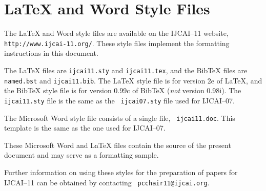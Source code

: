 \documentclass{article}
\begin{document}
\appendix

\section{\LaTeX{} and Word Style Files}\label{stylefiles}

The \LaTeX{} and Word style files are available on the IJCAI--11
website, {\tt http://www.ijcai-11.org/}.
These style files implement the formatting instructions in this
document.

The \LaTeX{} files are {\tt ijcai11.sty} and {\tt ijcai11.tex}, and
the Bib\TeX{} files are {\tt named.bst} and {\tt ijcai11.bib}. The
\LaTeX{} style file is for version 2e of \LaTeX{}, and the Bib\TeX{}
style file is for version 0.99c of Bib\TeX{} ({\em not} version
0.98i). The {\tt ijcai11.sty} file is the same as the {\tt
ijcai07.sty} file used for IJCAI--07.

The Microsoft Word style file consists of a single file, {\tt
ijcai11.doc}. This template is the same as the one used for
IJCAI--07.

These Microsoft Word and \LaTeX{} files contain the source of the
present document and may serve as a formatting sample.

Further information on using these styles for the preparation of
papers for IJCAI--11 can be obtained by contacting {\tt
pcchair11@ijcai.org}.



\end{document}
